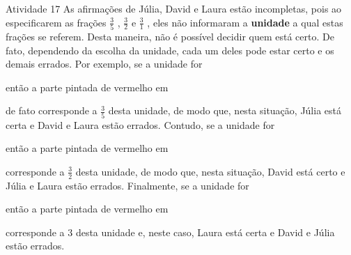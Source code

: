 \begin{multicols}{2}
\begin{resposta*}{Atividade 17}
  As afirmações de Júlia, David e Laura estão incompletas, pois ao especificarem as frações   $\frac{3}{5}$  ,   $\frac{3}{2}$   e   $\frac{3}{1}$  , eles não informaram a   {\bf unidade}   a qual estas frações se referem. Desta maneira, não é possível decidir quem está certo. De fato, dependendo da escolha da unidade, cada um deles pode estar certo e os demais errados. Por exemplo, se a unidade for
\begin{center}
\end{center}
então a parte pintada de vermelho em 
\begin{center}
\end{center}
de fato corresponde a   $\frac{3}{5}$   desta unidade, de modo que, nesta situação, Júlia está certa e David e Laura estão errados. Contudo, se a unidade for
\begin{center}
\end{center}
então a parte pintada de vermelho em
\begin{center}
\end{center}
  corresponde a   $\frac{3}{2}$   desta unidade,  de modo que, nesta situação, David está certo e Júlia e Laura estão errados. Finalmente, se a unidade for
\begin{center}
\end{center}
então a parte pintada de vermelho em
\begin{center}
\end{center}
  corresponde a   $3$   desta unidade e, neste caso, Laura está certa e David e Júlia estão errados.
\end{resposta*}


\end{multicols}
